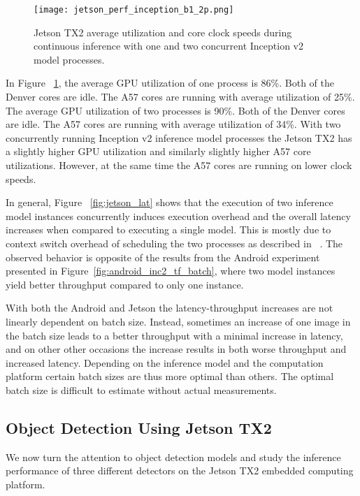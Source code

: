 \documentclass[sigconf]{acmart}
\begin{document}
\begin{figure}[t]
\centering
\texttt{[image: jetson\_perf\_inception\_b1\_2p.png]}
\caption{Jetson TX2 average utilization and core clock speeds during continuous inference with one and two concurrent Inception v2 model processes.}
\label{fig:jetson_perf_inception_p2}
\end{figure}

In Figure ~\ref{fig:jetson_perf_inception_p2}, the average GPU utilization of one process is 86\%. Both of the Denver cores are idle. The A57 cores are running with average utilization of 25\%. The average GPU utilization of two processes is 90\%. Both of the Denver cores are idle. The A57 cores are running with average utilization of 34\%. With two concurrently running Inception v2 inference model processes the Jetson TX2 has a slightly higher GPU utilization and similarly slightly higher A57 core utilizations. However, at the same time the A57 cores are running on lower clock speeds.

In general, Figure ~\ref{fig:jetson_lat} shows that the execution of two inference model instances concurrently induces execution overhead and the overall latency increases when compared to executing a single model. This is mostly due to context switch overhead of scheduling the two processes as described in ~\cite{Amert2017GPUSO}.
The observed behavior is opposite of the results from the Android experiment presented in Figure~\ref{fig:android_inc2_tf_batch}, where two model instances yield better throughput compared to only one instance.

With both the Android and Jetson the latency-throughput increases are not linearly dependent on batch size. Instead, sometimes an increase of one image in the batch size leads to a better throughput with a minimal increase in latency, and on other other occasions the increase results in both worse throughput and increased latency. Depending on the inference model and the computation platform certain batch sizes are thus more optimal than others. The optimal batch size is difficult to estimate without actual measurements.

\subsection{Object Detection Using Jetson TX2}\label{sec:object_detection_jetson}
We now turn the attention to object detection models and study the inference performance of three different detectors on the Jetson TX2 embedded computing platform.
\end{document}
